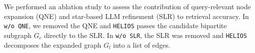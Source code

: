 \begin{table}[t]
    \centering
    \setlength{\tabcolsep}{2pt} %
    \vspace{-3mm}
    \caption{\label{tab:ablation_study}
        Retrieval accuracy of \texttt{OTT-QA}'s dev set for \texttt{HELIOS}'s design factors.
    }
    \vspace{-3mm}
\end{table}



We performed an ablation study to assess the contribution of query-relevant node expansion (QNE) and star-based LLM refinement (SLR) to retrieval accuracy.
In \texttt{w/o QNE}, we removed the QNE and \texttt{HELIOS} passes the candidate bipartite subgraph $G_c$ directly to the SLR.
In \texttt{w/o SLR}, the SLR was removed and \texttt{HELIOS} decomposes the expanded graph $G_l$ into a list of edges.


